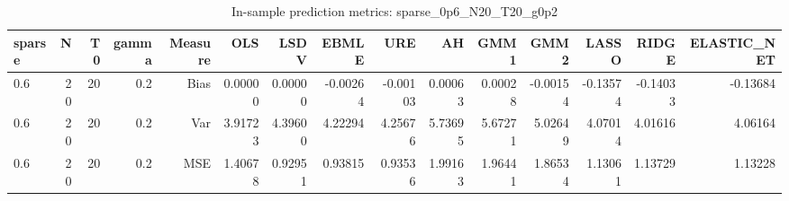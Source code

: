 \begin{table}[!htbp]\centering
\caption{In-sample prediction metrics: sparse_0p6_N20_T20_g0p2}
\label{tab:table2_sparse_0p6_N20_T20_g0p2}
\begin{tabular}{lrrrrrrrrrrrrrr}
\hline
sparse & N & T0 & gamma & Measure & OLS & LSDV & EBMLE & URE & AH & GMM1 & GMM2 & LASSO & RIDGE & ELASTIC_NET \\
\hline
0.6 & 20 & 20 & 0.2 & Bias & 0.00000 & 0.00000 & -0.00264 & -0.00103 & 0.00063 & 0.00028 & -0.00154 & -0.13574 & -0.14033 & -0.13684 \\
0.6 & 20 & 20 & 0.2 & Var & 3.91723 & 4.39600 & 4.22294 & 4.25676 & 5.73695 & 5.67271 & 5.02649 & 4.07014 & 4.01616 & 4.06164 \\
0.6 & 20 & 20 & 0.2 & MSE & 1.40678 & 0.92951 & 0.93815 & 0.93536 & 1.99163 & 1.96441 & 1.86534 & 1.13061 & 1.13729 & 1.13228 \\
\hline
\end{tabular}
\end{table}

